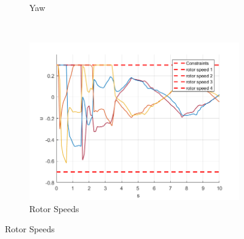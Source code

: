 \documentclass[11pt]{article}
\begin{document}
\begin{enumerate}
\begin{figure}[ht]
\begin{subfigure}[c]{0.3\linewidth}
            \caption{Yaw}
        \end{subfigure}
        ~
        \begin{subfigure}[c]{0.3\linewidth}
            \centering
            \includegraphics[width=\linewidth]{Plots_06_ReferenceTracking_Varying/03}
            \caption{Rotor Speeds}
        \end{subfigure}


\end{figure}
\end{enumerate}
\end{document}
